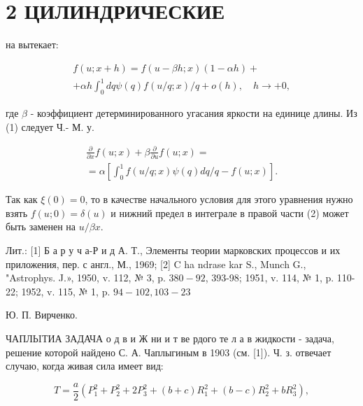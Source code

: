 \documentclass[10pt]{article}
\begin{document}
\section{2 ЦИЛИНДРИЧЕСКИЕ}

на вытекает:



\[

\begin{gathered}

f(u ; x+h)=f(u-\beta h ; x)(1-\alpha h)+ \\

+\alpha h \int_{0}^{1} d q \psi(q) f(u / q ; x) / q+o(h), \quad h \rightarrow+0,

\end{gathered}

\]



где $\beta$ - коэффициент детерминированного угасания яркости на единице длины. Из (1) следует Ч.- М. у.



\[

\begin{gathered}

\frac{\partial}{\partial x} f(u ; x)+\beta \frac{\partial}{\partial u} f(u ; x)= \\

=\alpha\left[\int_{0}^{1} f(u / q ; x) \psi(q) d q / q-f(u ; x)\right] .

\end{gathered}

\]



Так как $\xi(0)=0$, то в качестве начального условия для этого уравнения нужно взять $f(u ; 0)=\delta(u)$ и нижний предел в интеграле в правой части (2) может быть заменен на $u / \beta x$.



Лит.: [1] Б а р у ч а-Р и д А. Т., Элементы теории марковских процессов и их приложения, пер. с англ., М., 1969; [2] C ha ndrase kar S., Munch G., "Astrophys. J.», 1950, v. 112, № 3, p. $380-92$, 393-98; 1951, v. 114, № 1, p. 110-22; 1952, v. 115, № 1, p. $94-102,103-23$



Ю. П. Вирченко.



ЧАПЛЬIТИА ЗАДАЧА о д в и Ж ни и т ве рдого те л а в жидкости - задача, решение которой найдено С. А. Чаплыгиным в 1903 (см. [1]). Ч. з. отвечает случаю, когда живая сила имеет вид:



\[

T=\frac{a}{2}\left(P_{1}^{2}+P_{2}^{2}+2 P_{3}^{2}+(b+c) R_{1}^{2}+(b-c) R_{2}^{2}+b R_{3}^{2}\right),

\]
\end{document}
